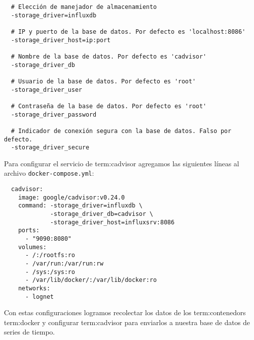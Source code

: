 \begin{lstlisting}
  # Elección de manejador de almacenamiento
  -storage_driver=influxdb

  # IP y puerto de la base de datos. Por defecto es 'localhost:8086'
  -storage_driver_host=ip:port

  # Nombre de la base de datos. Por defecto es 'cadvisor'
  -storage_driver_db

  # Usuario de la base de datos. Por defecto es 'root'
  -storage_driver_user

  # Contraseña de la base de datos. Por defecto es 'root'
  -storage_driver_password

  # Indicador de conexión segura con la base de datos. Falso por defecto.
  -storage_driver_secure
\end{lstlisting}

Para configurar el servicio de \gls{term:cadvisor} agregamos las siguientes
líneas al archivo \lstinline{docker-compose.yml}:

\begin{lstlisting}
  cadvisor:
    image: google/cadvisor:v0.24.0
    command: -storage_driver=influxdb \
             -storage_driver_db=cadvisor \
             -storage_driver_host=influxsrv:8086
    ports:
      - "9090:8080"
    volumes:
      - /:/rootfs:ro
      - /var/run:/var/run:rw
      - /sys:/sys:ro
      - /var/lib/docker/:/var/lib/docker:ro
    networks:
      - lognet
\end{lstlisting}

Con estas configuraciones logramos recolectar los datos de los
\glspl{term:contenedor} \gls{term:docker} y configurar \gls{term:cadvisor} para
enviarlos a nuestra base de datos de series de tiempo.
